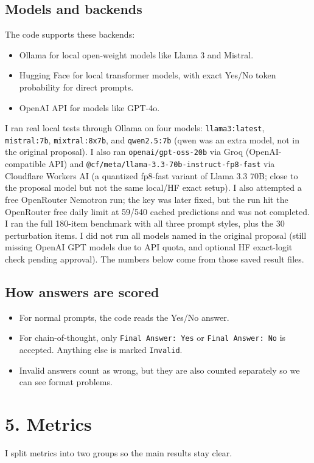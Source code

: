 \documentclass[11pt, a4paper]{article}
\begin{document}
\subsection*{\color{bambergnavy} Models and backends}
The code supports these backends:
\begin{itemize}[leftmargin=*]
    \item Ollama for local open-weight models like Llama 3 and Mistral.
    \item Hugging Face for local transformer models, with exact Yes/No token probability for direct prompts.
    \item OpenAI API for models like GPT-4o.
\end{itemize}
I ran real local tests through Ollama on four models: \texttt{llama3:latest}, \texttt{mistral:7b}, \texttt{mixtral:8x7b}, and \texttt{qwen2.5:7b} (qwen was an extra model, not in the original proposal). I also ran \texttt{openai/gpt-oss-20b} via Groq (OpenAI-compatible API) and \texttt{@cf/meta/llama-3.3-70b-instruct-fp8-fast} via Cloudflare Workers AI (a quantized fp8-fast variant of Llama 3.3 70B; close to the proposal model but not the same local/HF exact setup). I also attempted a free OpenRouter Nemotron run; the key was later fixed, but the run hit the OpenRouter free daily limit at 59/540 cached predictions and was not completed. I ran the full 180-item benchmark with all three prompt styles, plus the 30 perturbation items. I did not run all models named in the original proposal (still missing OpenAI GPT models due to API quota, and optional HF exact-logit check pending approval). The numbers below come from those saved result files.

\subsection*{\color{bambergnavy} How answers are scored}
\begin{itemize}[leftmargin=*]
    \item For normal prompts, the code reads the Yes/No answer.
    \item For chain-of-thought, only \texttt{Final Answer: Yes} or \texttt{Final Answer: No} is accepted. Anything else is marked \texttt{Invalid}.
    \item Invalid answers count as wrong, but they are also counted separately so we can see format problems.
\end{itemize}

\FloatBarrier
{}
\section*{\color{bambergnavy} 5. Metrics}
I split metrics into two groups so the main results stay clear.
\end{document}
